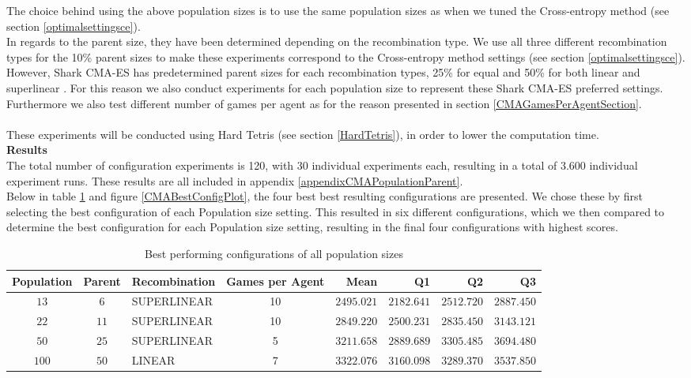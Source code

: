 The choice behind using the above population sizes is to use the same population sizes as
when we tuned the Cross-entropy method (see section \ref{optimalsettingsce}).\\
In regards to the parent size, they have been determined depending on the recombination type.
We use all three different recombination types for the 10\% parent sizes to make these experiments
correspond to the Cross-entropy method settings (see section \ref{optimalsettingsce}). However, Shark CMA-ES
has predetermined parent sizes for each recombination types, 25\% for equal and 50\% for both
linear and superlinear \citep{shark08}. For this reason we also conduct experiments for each population
size to represent these Shark CMA-ES preferred settings.
Furthermore we also test different number of games per agent as for the reason presented in section \ref{CMAGamesPerAgentSection}.\\\\
These experiments will be conducted using Hard Tetris (see section \ref{HardTetris}), in order
to lower the computation time.\\

\textbf{Results}\\
The total number of configuration experiments is 120, with 30 individual experiments each,
resulting in a total of 3.600 individual experiment runs. These results are all included in 
appendix \ref{appendixCMAPopulationParent}.\\
Below in table \ref{CMABestConfigTable} and figure \ref{CMABestConfigPlot}, the four best
best resulting configurations are presented. We chose these by first selecting the best 
configuration of each Population size setting. This resulted in six different
configurations, which we then compared to determine the best
configuration for each Population size setting, resulting in the final four configurations with
highest scores.

\begin{table}[H]
\centering
\small
\begin{tabular}{c c l c r r r r}
Population & Parent & Recombination & Games per Agent & Mean & Q1 & Q2 & Q3\\
\hline
$13$ & $6$ & SUPERLINEAR & 10 & $2495.021$ & $2182.641$ & $2512.720$ & $2887.450$\\
$22$ & $11$ & SUPERLINEAR & 10 & $2849.220$ & $2500.231$ & $2835.450$ & $3143.121$\\
$50$ & $25$ & SUPERLINEAR & 5 & $3211.658$ & $2889.689$ & $3305.485$ & $3694.480$\\
$100$ & $50$ & LINEAR & 7 & $3322.076$ & $3160.098$ & $3289.370$ & $3537.850$\\
\end{tabular}
\caption{Best performing configurations of all population sizes \label{CMABestConfigTable}}
\end{table}

